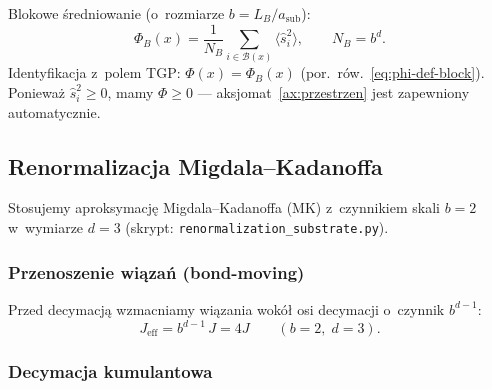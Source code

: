 Blokowe \'sredniowanie (o~rozmiarze $b = L_B / a_{\mathrm{sub}}$):
\begin{equation}\label{eq:B-block}
  \Phi_B(x) = \frac{1}{N_B} \sum_{i \in \mathcal{B}(x)}
  \langle \hat{s}_i^2 \rangle,
  \qquad
  N_B = b^d.
\end{equation}
Identyfikacja z~polem TGP:
$\Phi(x) = \Phi_B(x)$
(por.\ r\'ow.~\ref{eq:phi-def-block}).
Poniewa\.z $\hat{s}_i^2 \geq 0$, mamy $\Phi \geq 0$ ---
aksjomat~\ref{ax:przestrzen} jest zapewniony automatycznie.

\subsection{Renormalizacja Migdala--Kadanoffa}\label{app:B-MK}

Stosujemy aproksymacj\k{e} Migdala--Kadanoffa (MK) z~czynnikiem
skali $b = 2$ w~wymiarze $d = 3$
(skrypt: \texttt{renormalization\_substrate.py}).

\subsubsection{Przenoszenie wi\k{a}za\'n (bond-moving)}

Przed decymacj\k{a} wzmacniamy wi\k{a}zania wok\'o\l{} osi
decymacji o~czynnik $b^{d-1}$:
\begin{equation}\label{eq:B-bond-move}
  J_{\mathrm{eff}} = b^{d-1}\,J = 4J \qquad (b=2,\;d=3).
\end{equation}

\subsubsection{Decymacja kumulantowa}


